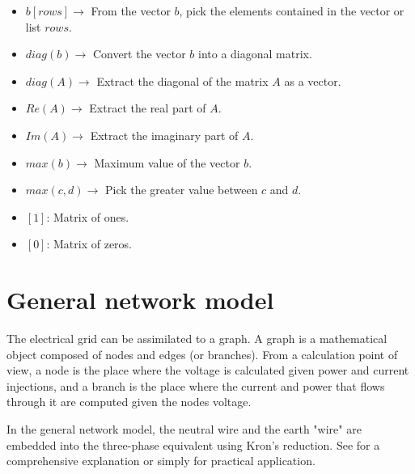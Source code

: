 \documentclass[a4paper,twoside,fleqn]{tufte-book}
\begin{document}
\begin{fullwidth}
\begin{multicols}{2}
\begin{itemize}
	
	\item $b[rows] \rightarrow$ From the vector $b$, pick the elements contained in the vector or list $rows$.
	
	\item $diag(b) \rightarrow$ Convert the vector $b$ into a diagonal matrix. 
	
	\item $diag(A) \rightarrow$ Extract the diagonal of the matrix $A$ as a vector. 
	
	\item $Re(A) \rightarrow$ Extract the real part of $A$.
	
	\item $Im(A) \rightarrow$ Extract the imaginary part of $A$.
	
	\item $max(b) \rightarrow$ Maximum value of the vector $b$.
	
	\item $max(c, d) \rightarrow$ Pick the greater value between $c$ and $d$.
	
	\item $[1]$: Matrix of ones.

	\item $[0]$: Matrix of zeros.
\end{itemize}

\end{multicols}

\end{fullwidth}

\chapter{General network model}

The electrical grid can be assimilated to a graph. A graph is a mathematical object composed of nodes and edges (or branches). From a calculation point of view, a node is the place where the voltage is calculated given power and current injections, and a branch is the place where the current and power that flows through it are computed given the nodes voltage.

In the general network model, the neutral wire and the earth "wire" are embedded into the three-phase equivalent using Kron's reduction. See \cite{dorfler2013kron} for a comprehensive explanation or simply \cite{kersting2012distribution} for practical application.
\end{document}
